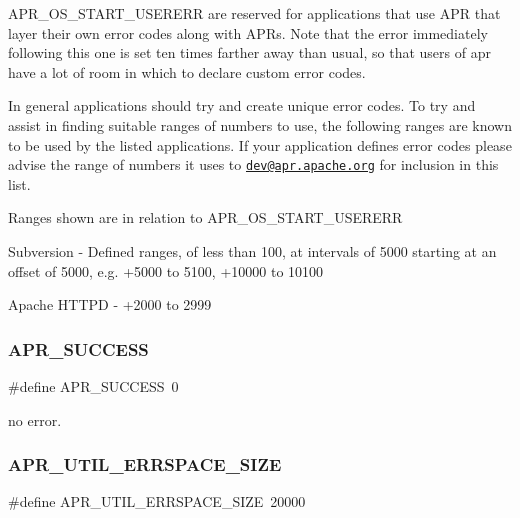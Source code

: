 A\+P\+R\+\_\+\+O\+S\+\_\+\+S\+T\+A\+R\+T\+\_\+\+U\+S\+E\+R\+E\+RR are reserved for applications that use A\+PR that layer their own error codes along with A\+PR\textquotesingle{}s. Note that the error immediately following this one is set ten times farther away than usual, so that users of apr have a lot of room in which to declare custom error codes.

In general applications should try and create unique error codes. To try and assist in finding suitable ranges of numbers to use, the following ranges are known to be used by the listed applications. If your application defines error codes please advise the range of numbers it uses to \href{mailto:dev@apr.apache.org}{\tt dev@apr.\+apache.\+org} for inclusion in this list.

Ranges shown are in relation to A\+P\+R\+\_\+\+O\+S\+\_\+\+S\+T\+A\+R\+T\+\_\+\+U\+S\+E\+R\+E\+RR

Subversion -\/ Defined ranges, of less than 100, at intervals of 5000 starting at an offset of 5000, e.\+g. +5000 to 5100, +10000 to 10100

Apache H\+T\+T\+PD -\/ +2000 to 2999 \mbox{\label{group__apr__errno_ga9ee311b7bf1c691dc521d721339ee2a6}} 
\subsubsection{\texorpdfstring{A\+P\+R\+\_\+\+S\+U\+C\+C\+E\+SS}{APR\_SUCCESS}}
{\footnotesize\ttfamily \#define A\+P\+R\+\_\+\+S\+U\+C\+C\+E\+SS~0}

no error. \mbox{\label{group__apr__errno_gaef5e79630739f24d1512d0d044c2bae7}} 
\subsubsection{\texorpdfstring{A\+P\+R\+\_\+\+U\+T\+I\+L\+\_\+\+E\+R\+R\+S\+P\+A\+C\+E\+\_\+\+S\+I\+ZE}{APR\_UTIL\_ERRSPACE\_SIZE}}
{\footnotesize\ttfamily \#define A\+P\+R\+\_\+\+U\+T\+I\+L\+\_\+\+E\+R\+R\+S\+P\+A\+C\+E\+\_\+\+S\+I\+ZE~20000}

